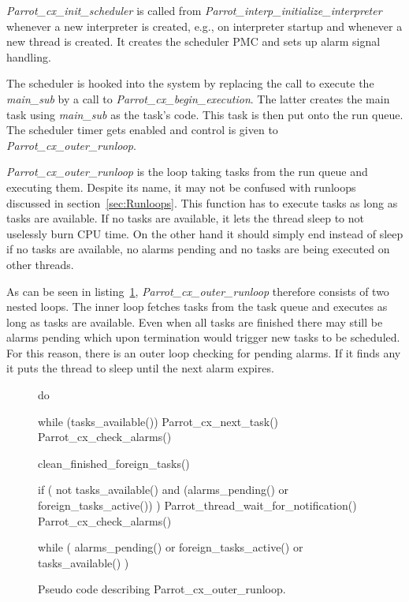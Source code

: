 \documentclass[bachelor,english]{hgbthesis}
\begin{document}
\textit{Parrot\_cx\_init\_scheduler} is called from \textit{Parrot\_\-interp\-\_ini\-tialize\_\-inter\-preter} whenever a new interpreter is created, e.g., on interpreter startup and whenever a new thread is created. It creates the scheduler PMC and sets up alarm signal handling.

The scheduler is hooked into the system by replacing the call to execute the \textit{main\_sub} by a call to \textit{Parrot\_cx\_begin\_execution}. The latter creates the main task using \textit{main\_sub} as the task's code. This task is then put onto the run queue. The scheduler timer gets enabled and control is given to \textit{Parrot\_cx\_outer\_runloop}.

\textit{Parrot\_cx\_outer\_runloop} is the loop taking tasks from the run queue and executing them. Despite its name, it may not be confused with runloops discussed in section~\ref{sec:Runloops}. This function has to execute tasks as long as tasks are available. If no tasks are available, it lets the thread sleep to not uselessly burn CPU time. On the other hand it should simply end instead of sleep if no tasks are available, no alarms pending and no tasks are being executed on other threads.

As can be seen in listing~\ref{fig:outerrunloop}, \textit{Parrot\_cx\_outer\_runloop} therefore consists of two nested loops. The inner loop fetches tasks from the task queue and executes as long as tasks are available. Even when all tasks are finished there may still be alarms pending which upon termination would trigger new tasks to be scheduled. For this reason, there is an outer loop checking for pending alarms. If it finds any it puts the thread to sleep until the next alarm expires.

\begin{figure}
\centering
\begin{GenericCode}
do {
    while (tasks_available()) {
        Parrot_cx_next_task()
        Parrot_cx_check_alarms()
    }

    clean_finished_foreign_tasks()

    if (
        not tasks_available()
        and (alarms_pending() or foreign_tasks_active())
    ) {
        Parrot_thread_wait_for_notification()
        Parrot_cx_check_alarms()
    }
} while (
    alarms_pending()
    or foreign_tasks_active()
    or tasks_available()
)
\end{GenericCode}
\caption{Pseudo code describing Parrot\_cx\_outer\_runloop.}
\label{fig:outerrunloop}
\end{figure}
\end{document}
